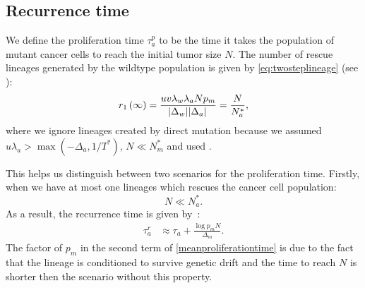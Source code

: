 \documentclass[12pt]{extarticle}
\begin{document}
\begin{appendices}
\section{Recurrence time}\label{sec:appendix_recurrence_time}
We define the proliferation time $\tau_a^p$  to be the time it takes the population of mutant cancer cells to reach the initial tumor size $N$. The number of rescue lineages generated by the wildtype population is given by  \cref{eq:twosteplineage} (see ):
\begin{equation*}
r_1\left(\infty\right)=\frac{uv\lambda_w\lambda_aNp_m}{\abs{\Delta_w}\abs{\Delta_a}}=\frac{N}{N_a^*},
\end{equation*}
where we ignore lineages created by direct mutation because we assumed $u\lambda_a > \max{(-\Delta_a, 1/T^*)}$, $N\ll N_m^*$ and used .

This helps us distinguish between two scenarios for the proliferation time. Firstly, when we have at most one lineages which rescues the cancer cell population:
\begin{equation*}
N\ll N_a^*.
\end{equation*}
As a result, the recurrence time is given by~\citep{avanzini2019cancer}:
\begin{align}\label{meanproliferationtime}
\tau_a^r&\approx\tau_a+\frac{\log p_mN}{\Delta_m}.
\end{align}
The factor of $p_m$ in the second term of \cref{meanproliferationtime} is due to the fact that the lineage is conditioned to survive genetic drift and the time to reach $N$ is shorter then the scenario without this property. 


\end{appendices}
\end{document}
